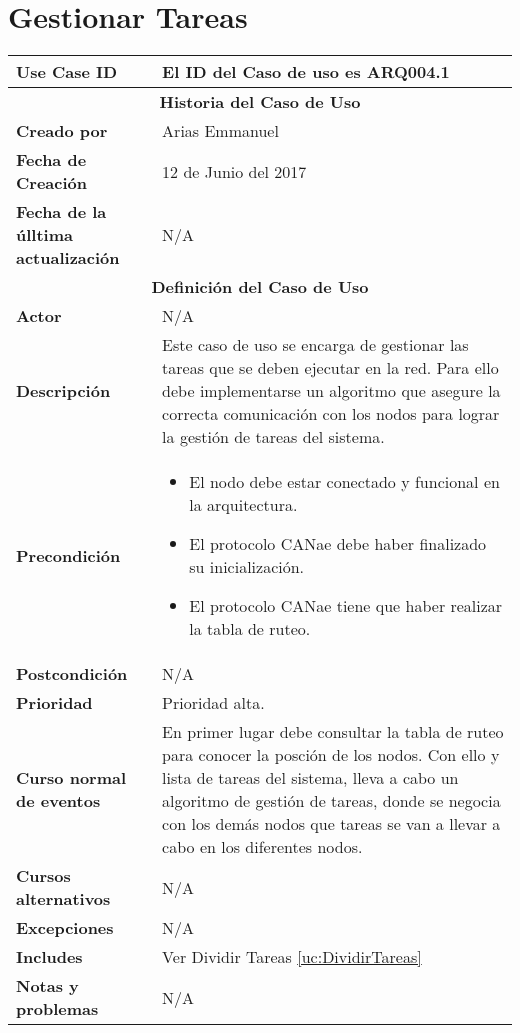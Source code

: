 
\section{Gestionar Tareas}\label{uc:GestionarTareas}

\begin{longtable}{|p{5cm}|p{8cm}|}
  \hline
  \textbf{Use Case ID} & El ID del Caso de uso es ARQ004.1 \\ \hline
  \multicolumn{2}{|c|}{\Large\textbf{Historia del Caso de Uso}} \\ \hline
  \textbf{Creado por} & Arias Emmanuel \\ \hline
  \textbf{Fecha de Creación} & 12 de Junio del 2017 \\ \hline
  \textbf{Fecha de la úlltima actualización} & N/A \\ \hline
  \multicolumn{2}{|c|}{\Large\textbf{Definición del Caso de Uso}} \\ \hline
  \textbf{Actor} & N/A \\ \hline
  \textbf{Descripción} & Este caso de uso se encarga de gestionar las tareas que se deben
ejecutar en la red. Para ello debe implementarse un algoritmo que
asegure la correcta comunicación con los nodos para lograr
la gestión de tareas del sistema. \\ \hline
  \textbf{Precondición} & \begin{itemize}
\item El nodo debe estar conectado y funcional en la arquitectura.
\item El protocolo CANae debe haber finalizado su inicialización.
\item El protocolo CANae tiene que haber realizar la tabla de ruteo.
\end{itemize} \\ \hline
  \textbf{Postcondición}  & N/A \\ \hline
  \textbf{Prioridad} & Prioridad alta. \\ \hline
  \textbf{Curso normal de eventos} & En primer lugar debe consultar la tabla de ruteo para conocer la posción de los nodos.
Con ello y lista de tareas del sistema, lleva a cabo un algoritmo de
gestión de tareas, donde se negocia con los demás nodos que tareas se
van a llevar a cabo en los diferentes nodos. \\ \hline
\textbf{Cursos alternativos} & N/A \\ \hline
\textbf{Excepciones} & N/A \\ \hline
\textbf{Includes} & Ver Dividir Tareas \ref{uc:DividirTareas} \\ \hline
\textbf{Notas y problemas} & N/A \\ \hline
\end{longtable}



